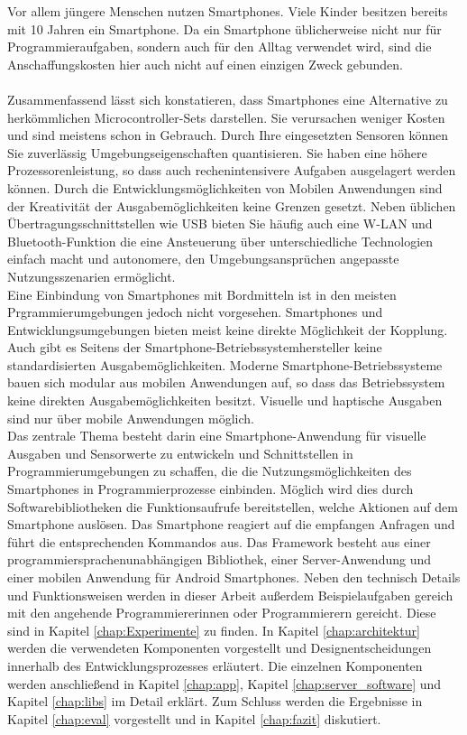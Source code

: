 \documentclass[11pt,a4paper]{report}
\begin{document}
Vor allem jüngere Menschen nutzen Smartphones.
Viele Kinder besitzen bereits mit 10 Jahren \cite{bitkom_smartphones} ein Smartphone.
Da ein Smartphone üblicherweise nicht nur für Programmieraufgaben, sondern auch für den Alltag verwendet wird, sind die Anschaffungskosten hier auch nicht auf einen einzigen Zweck gebunden.
\\\\
Zusammenfassend lässt sich konstatieren, dass Smartphones eine Alternative zu herkömmlichen Microcontroller-Sets darstellen.
Sie verursachen weniger Kosten und sind meistens schon in Gebrauch.
Durch Ihre eingesetzten Sensoren können Sie zuverlässig Umgebungseigenschaften quantisieren.
Sie haben eine höhere Prozessorenleistung, so dass auch rechenintensivere Aufgaben ausgelagert werden können.
Durch die Entwicklungsmöglichkeiten von Mobilen Anwendungen sind der Kreativität der Ausgabemöglichkeiten keine Grenzen gesetzt.
Neben üblichen Übertragungsschnittstellen wie USB bieten Sie häufig auch eine W-LAN und Bluetooth-Funktion die eine Ansteuerung über unterschiedliche Technologien einfach macht und autonomere, den Umgebungsansprüchen angepasste Nutzungsszenarien ermöglicht.
\\
Eine Einbindung von Smartphones mit Bordmitteln ist in den meisten Prgrammierumgebungen jedoch nicht vorgesehen.
Smartphones und Entwicklungsumgebungen bieten meist keine direkte Möglichkeit der Kopplung.
Auch gibt es Seitens der Smartphone-Betriebssystemhersteller keine standardisierten Ausgabemöglichkeiten.
Moderne Smartphone-Betriebssysteme bauen sich modular aus mobilen Anwendungen auf, so dass das Betriebssystem keine direkten Ausgabemöglichkeiten besitzt.
Visuelle und haptische Ausgaben sind nur über mobile Anwendungen möglich.
\\
Das zentrale Thema besteht darin eine Smartphone-Anwendung für visuelle Ausgaben und Sensorwerte zu entwickeln und Schnittstellen in Programmierumgebungen zu schaffen, die die Nutzungsmöglichkeiten des Smartphones in Programmierprozesse einbinden.
Möglich wird dies durch Softwarebibliotheken die Funktionsaufrufe bereitstellen, welche Aktionen auf dem Smartphone auslösen.
Das Smartphone reagiert auf die empfangen Anfragen und führt die entsprechenden Kommandos aus.
Das Framework besteht aus einer programmiersprachenunabhängigen Bibliothek, einer Server-Anwendung und einer mobilen Anwendung für Android Smartphones.
Neben den technisch Details und Funktionsweisen werden in dieser Arbeit außerdem Beispielaufgaben gereich mit den angehende Programmiererinnen oder Programmierern gereicht.
Diese sind in Kapitel \ref{chap:Experimente} zu finden.
In Kapitel \ref{chap:architektur} werden die verwendeten Komponenten vorgestellt und Designentscheidungen innerhalb des Entwicklungsprozesses erläutert.
Die einzelnen Komponenten werden anschließend in Kapitel \ref{chap:app}, Kapitel \ref{chap:server_software} und Kapitel \ref{chap:libs} im Detail erklärt.
Zum Schluss werden die Ergebnisse in Kapitel \ref{chap:eval} vorgestellt und in Kapitel \ref{chap:fazit} diskutiert.
\end{document}
